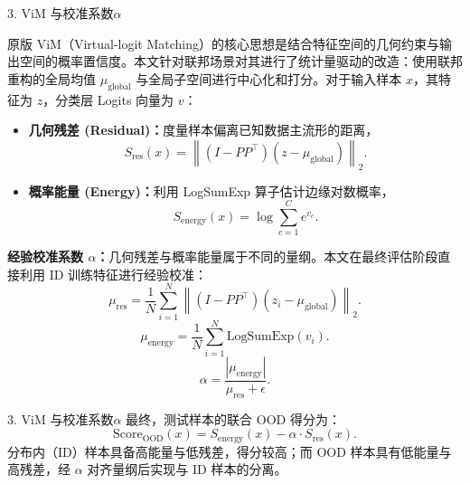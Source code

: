 \documentclass[11pt,aspectratio=169]{beamer}
\begin{document}
\begin{frame}{3. ViM 与校准系数$\alpha$}
  \small


  \hspace{2em}原版 ViM（Virtual-logit Matching）的核心思想是结合特征空间的几何约束与输出空间的概率置信度。本文针对联邦场景对其进行了统计量驱动的改造：使用联邦重构的全局均值 $\mu_{\mathrm{global}}$ 与全局子空间进行中心化和打分。对于输入样本 $x$，其特征为 $z$，分类层 Logits 向量为 $v$：
  \begin{itemize}
    \item \textbf{几何残差 (Residual)：}度量样本偏离已知数据主流形的距离，
    \[
      S_{\mathrm{res}}(x)=\left\|(I-PP^\top)(z-\mu_{\mathrm{global}})\right\|_2.
    \]
    \item \textbf{概率能量 (Energy)：}利用 LogSumExp 算子估计边缘对数概率，
    \[
      S_{\mathrm{energy}}(x)=\log\sum_{c=1}^C e^{v_c}.
    \]
  \end{itemize}

  \hspace{2em}\textbf{经验校准系数 $\alpha$：}几何残差与概率能量属于不同的量纲。本文在最终评估阶段直接利用 ID 训练特征进行经验校准：
  \[
    \mu_{\mathrm{res}} =
    \frac{1}{N}\sum_{i=1}^{N}\left\|(I-PP^\top)(z_i-\mu_{\mathrm{global}})\right\|_2.
  \]
  \[
    \mu_{\mathrm{energy}} =
    \frac{1}{N}\sum_{i=1}^{N}\mathrm{LogSumExp}(v_i).
  \]
  \[
    \alpha=\frac{|\mu_{\mathrm{energy}}|}{\mu_{\mathrm{res}}+\epsilon}.
  \]
\end{frame}



\begin{frame}{3. ViM 与校准系数$\alpha$}
  \small
  \hspace{2em}最终，测试样本的联合 OOD 得分为：
  \[
    \mathrm{Score}_{\mathrm{OOD}}(x)=S_{\mathrm{energy}}(x)-\alpha\cdot S_{\mathrm{res}}(x).
  \]
  \hspace{2em}分布内（ID）样本具备高能量与低残差，得分较高；而 OOD 样本具有低能量与高残差，经 $\alpha$ 对齐量纲后实现与 ID 样本的分离。
\end{frame}
\end{document}
